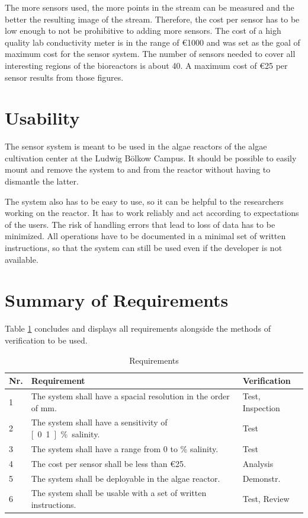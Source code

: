 The more sensors used, the more points in the stream can be measured and the better the resulting image of the stream. Therefore, the cost per sensor has to be low enough to not be prohibitive to adding more sensors.
The cost of a high quality lab conductivity meter is in the range of \euro{1000} and was set as the goal of maximum cost for the sensor system. The number of sensors needed to cover all interesting regions of the bioreactors is about 40.
A maximum cost of \euro{25} per sensor results from those figures.

\section{Usability}

The sensor system is meant to be used in the algae reactors of the algae cultivation center at the Ludwig Bölkow Campus. It should be possible to easily mount and remove the system to and from the reactor without having to dismantle the latter.

The system also has to be easy to use, so it can be helpful to the researchers working on the reactor. It has to work reliably and act according to expectations of the users. The risk of handling errors that lead to loss of data has to be minimized. All operations have to be documented in a minimal set of written instructions, so that the system can still be used even if the developer is not available.

\section{Summary of Requirements}

Table \ref{tab:req} concludes and displays all requirements alongside the methods of verification to be used.

\begin{table}[H]
    \centering

    \caption[Requirements]{Requirements}
    \label{tab:req}
    \begin{tabular}{lp{}l}
        	\toprule
        	Nr. & Requirement & Verification \tabularnewline
        	\midrule
		1 & The system shall have a spacial resolution in the order of \unit[10]{mm}. & Test, Inspection \tabularnewline
		2 & The system shall have a sensitivity of  \unit[0.1]{\%} salinity.  & Test \tabularnewline
		3 & The system shall have a range from 0 to \unit[5]{\%} salinity.  & Test \tabularnewline
		4 & The cost per sensor shall be less than \euro{25}.  & Analysis \tabularnewline
		5 & The system shall be deployable in the algae reactor. & Demonstr. \tabularnewline
		6 & The system shall be usable with a set of written instructions. & Test, Review \tabularnewline
        \bottomrule
    \end{tabular}
\end{table}